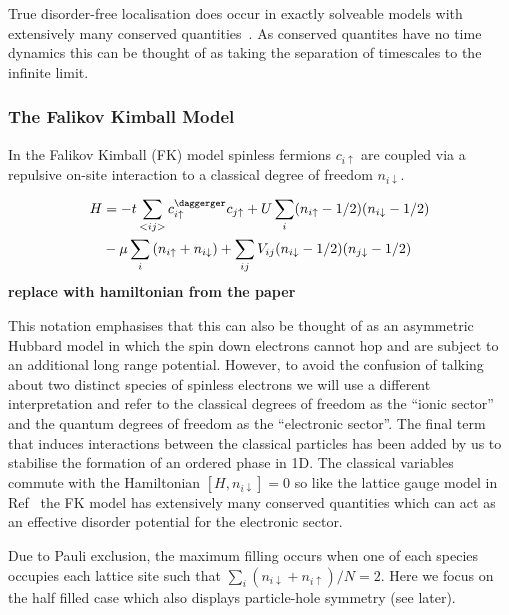 True disorder-free localisation does occur in exactly solveable models with extensively many conserved quantities~\autocite{smithDisorderFreeLocalization2017}. As conserved quantites have no time dynamics this can be thought of as taking the separation of timescales to the infinite limit.

\hypertarget{the-falikov-kimball-model}{%
\subsubsection{The Falikov Kimball Model}\label{the-falikov-kimball-model}}

In the Falikov Kimball (FK) model spinless fermions \(c_{i\uparrow}\) are coupled via a repulsive on-site interaction to a classical degree of freedom \(n_{i\downarrow}\).

\[\begin{aligned}
H &= -t \sum_{<ij>} c^\daggerger_{i\uparrow}c_{j\uparrow} + U \sum_{i} (n_{i \uparrow} - 1/2)( n_{i\downarrow} - 1/2) \\
       & - \mu \sum_i \left( n_{i \uparrow} + n_{i \downarrow} \right) + \sum_{ij} V_{ij} (n_{i\downarrow} - 1/2)(n_{j\downarrow} - 1/2) 
\end{aligned}\] \textbf{replace with hamiltonian from the paper}

This notation emphasises that this can also be thought of as an asymmetric Hubbard model in which the spin down electrons cannot hop and are subject to an additional long range potential. However, to avoid the confusion of talking about two distinct species of spinless electrons we will use a different interpretation and refer to the classical degrees of freedom as the ``ionic sector'' and the quantum degrees of freedom as the ``electronic sector''. The final term that induces interactions between the classical particles has been added by us to stabilise the formation of an ordered phase in 1D. The classical variables commute with the Hamiltonian \([H, n_{i\downarrow}] = 0\) so like the lattice gauge model in Ref~\autocite{smithDisorderFreeLocalization2017} the FK model has extensively many conserved quantities which can act as an effective disorder potential for the electronic sector.

Due to Pauli exclusion, the maximum filling occurs when one of each species occupies each lattice site such that \(\sum_i (n_{i\downarrow} + n_{i\uparrow} )/ N = 2\). Here we focus on the half filled case which also displays particle-hole symmetry (see later).

